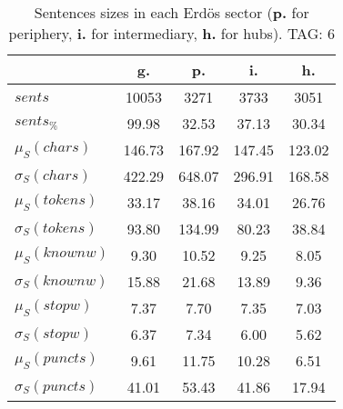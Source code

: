 \begin{table}[h!]
\begin{center}
\begin{tabular}{| l | c | c | c | c |}\hline
 & g. & p. & i. & h. \\\hline
$sents$ & 10053  & 3271  & 3733  & 3051 \\\hline
$sents_{\%}$ & 99.98  & 32.53  & 37.13  & 30.34 \\\hline
$\mu_S(chars)$ & 146.73  & 167.92  & 147.45  & 123.02 \\\hline
$\sigma_S(chars)$ & 422.29  & 648.07  & 296.91  & 168.58 \\\hline
$\mu_S(tokens)$ & 33.17  & 38.16  & 34.01  & 26.76 \\\hline
$\sigma_S(tokens)$ & 93.80  & 134.99  & 80.23  & 38.84 \\\hline
$\mu_S(knownw)$ & 9.30  & 10.52  & 9.25  & 8.05 \\\hline
$\sigma_S(knownw)$ & 15.88  & 21.68  & 13.89  & 9.36 \\\hline
$\mu_S(stopw)$ & 7.37  & 7.70  & 7.35  & 7.03 \\\hline
$\sigma_S(stopw)$ & 6.37  & 7.34  & 6.00  & 5.62 \\\hline
$\mu_S(puncts)$ & 9.61  & 11.75  & 10.28  & 6.51 \\\hline
$\sigma_S(puncts)$ & 41.01  & 53.43  & 41.86  & 17.94 \\\hline
\end{tabular}
\caption{Sentences sizes in each Erd\"os sector ({{\bf p.}} for periphery, {{\bf i.}} for intermediary, {{\bf h.}} for hubs). TAG: 6}
\end{center}
\end{table}